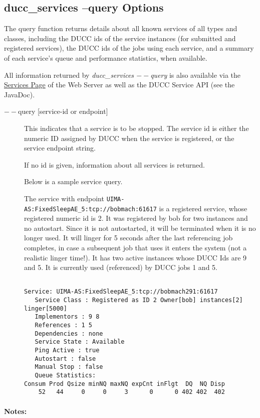     \subsection{ducc\_services --query Options}
    The query function returns details about all known services of all types and classes, including 
    the DUCC ids of the service instances (for submitted and registered services), the DUCC ids of 
    the jobs using each service, and a summary of each service's queue and performance statistics, 
    when available. 
    
    All information returned by {\em ducc\_services $--$query} is also available via the
    \hyperref[ws:services-page]{Services Page} of the Web Server as well as the DUCC Service API (see 
    the JavaDoc).

    \begin{description}
    \item[$--$query {[service-id or endpoint]}] This indicates that a service is to be stopped. The
      service id is either the numeric ID assigned by DUCC when the service is registered, or the
      service endpoint string.

      If no id is given, information about all services is returned. 

      Below is a sample service query.

      The service with endpoint {\tt UIMA-AS:FixedSleepAE\_5:tcp://bobmach:61617} is a 
      registered service, whose registered numeric id is 2. It was registered by bob for two instances and 
      no autostart. Since it is not autostarted, it will be terminated when it is no longer used. It 
      will linger for 5 seconds after the last referencing job completes, in case a subsequent job 
      that uses it enters the system (not a realistic linger time!). It has two active
      instances whose DUCC Ids are 9 and 5. It is currently used (referenced) 
      by DUCC jobs 1 and 5. 


\begin{verbatim}

Service: UIMA-AS:FixedSleepAE_5:tcp://bobmach291:61617 
   Service Class : Registered as ID 2 Owner[bob] instances[2] linger[5000] 
   Implementors : 9 8 
   References : 1 5 
   Dependencies : none 
   Service State : Available 
   Ping Active : true 
   Autostart : false 
   Manual Stop : false 
   Queue Statistics: 
Consum Prod Qsize minNQ maxNQ expCnt inFlgt  DQ  NQ Disp 
    52   44     0     0     3      0      0 402 402  402 
\end{verbatim}
    \end{description}
    \paragraph{Notes:}


